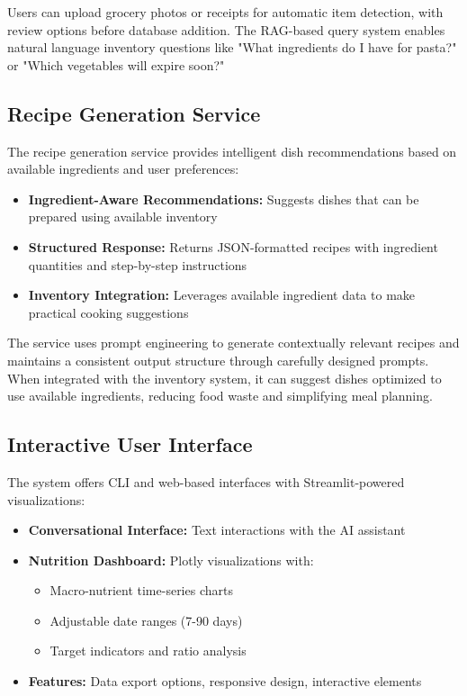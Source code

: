 \documentclass{ecai}
\begin{document}
Users can upload grocery photos or receipts for automatic item detection, with review options before database addition. The RAG-based query system enables natural language inventory questions like "What ingredients do I have for pasta?" or "Which vegetables will expire soon?"

\subsection{Recipe Generation Service}

The recipe generation service provides intelligent dish recommendations based on available ingredients and user preferences:

\begin{itemize}[noitemsep,topsep=0pt]
    \item \textbf{Ingredient-Aware Recommendations:} Suggests dishes that can be prepared using available inventory
    \item \textbf{Structured Response:} Returns JSON-formatted recipes with ingredient quantities and step-by-step instructions
    \item \textbf{Inventory Integration:} Leverages available ingredient data to make practical cooking suggestions
\end{itemize}

The service uses prompt engineering to generate contextually relevant recipes and maintains a consistent output structure through carefully designed prompts. When integrated with the inventory system, it can suggest dishes optimized to use available ingredients, reducing food waste and simplifying meal planning.

\subsection{Interactive User Interface}

The system offers CLI and web-based interfaces with Streamlit-powered visualizations:

\begin{itemize}[noitemsep,topsep=0pt]
    \item \textbf{Conversational Interface:} Text interactions with the AI assistant
    \item \textbf{Nutrition Dashboard:} Plotly visualizations with:
      \begin{itemize}[noitemsep,topsep=0pt]
        \item Macro-nutrient time-series charts
        \item Adjustable date ranges (7-90 days)
        \item Target indicators and ratio analysis
      \end{itemize}
    \item \textbf{Features:} Data export options, responsive design, interactive elements
\end{itemize}
\end{document}
